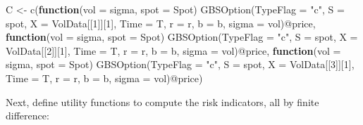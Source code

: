 \documentclass[]{tufte-book}
\newenvironment{Shaded}{}{}
\newcommand{\AttributeTok}[1]{\textcolor[rgb]{0.49,0.56,0.16}{#1}}
\newcommand{\ControlFlowTok}[1]{\textcolor[rgb]{0.00,0.44,0.13}{\textbf{#1}}}
\newcommand{\DecValTok}[1]{\textcolor[rgb]{0.25,0.63,0.44}{#1}}
\newcommand{\FunctionTok}[1]{\textcolor[rgb]{0.02,0.16,0.49}{#1}}
\newcommand{\NormalTok}[1]{#1}
\newcommand{\OtherTok}[1]{\textcolor[rgb]{0.00,0.44,0.13}{#1}}
\newcommand{\SpecialCharTok}[1]{\textcolor[rgb]{0.25,0.44,0.63}{#1}}
\newcommand{\StringTok}[1]{\textcolor[rgb]{0.25,0.44,0.63}{#1}}
\begin{document}
\begin{Shaded}
\begin{Highlighting}[]
\NormalTok{C }\OtherTok{\textless{}{-}} \FunctionTok{c}\NormalTok{(}\ControlFlowTok{function}\NormalTok{(}\AttributeTok{vol =}\NormalTok{ sigma, }\AttributeTok{spot =}\NormalTok{ Spot) }\FunctionTok{GBSOption}\NormalTok{(}\AttributeTok{TypeFlag =} \StringTok{"c"}\NormalTok{,}
    \AttributeTok{S =}\NormalTok{ spot, }\AttributeTok{X =}\NormalTok{ VolData[[}\DecValTok{1}\NormalTok{]][}\DecValTok{1}\NormalTok{], }\AttributeTok{Time =}\NormalTok{ T, }\AttributeTok{r =}\NormalTok{ r, }\AttributeTok{b =}\NormalTok{ b, }\AttributeTok{sigma =}\NormalTok{ vol)}\SpecialCharTok{@}\NormalTok{price,}
    \ControlFlowTok{function}\NormalTok{(}\AttributeTok{vol =}\NormalTok{ sigma, }\AttributeTok{spot =}\NormalTok{ Spot) }\FunctionTok{GBSOption}\NormalTok{(}\AttributeTok{TypeFlag =} \StringTok{"c"}\NormalTok{,}
        \AttributeTok{S =}\NormalTok{ spot, }\AttributeTok{X =}\NormalTok{ VolData[[}\DecValTok{2}\NormalTok{]][}\DecValTok{1}\NormalTok{], }\AttributeTok{Time =}\NormalTok{ T, }\AttributeTok{r =}\NormalTok{ r, }\AttributeTok{b =}\NormalTok{ b,}
        \AttributeTok{sigma =}\NormalTok{ vol)}\SpecialCharTok{@}\NormalTok{price, }\ControlFlowTok{function}\NormalTok{(}\AttributeTok{vol =}\NormalTok{ sigma, }\AttributeTok{spot =}\NormalTok{ Spot) }\FunctionTok{GBSOption}\NormalTok{(}\AttributeTok{TypeFlag =} \StringTok{"c"}\NormalTok{,}
        \AttributeTok{S =}\NormalTok{ spot, }\AttributeTok{X =}\NormalTok{ VolData[[}\DecValTok{3}\NormalTok{]][}\DecValTok{1}\NormalTok{], }\AttributeTok{Time =}\NormalTok{ T, }\AttributeTok{r =}\NormalTok{ r, }\AttributeTok{b =}\NormalTok{ b,}
        \AttributeTok{sigma =}\NormalTok{ vol)}\SpecialCharTok{@}\NormalTok{price)}
\end{Highlighting}
\end{Shaded}

Next, define utility functions to compute the risk indicators, all by
finite difference:
\end{document}
